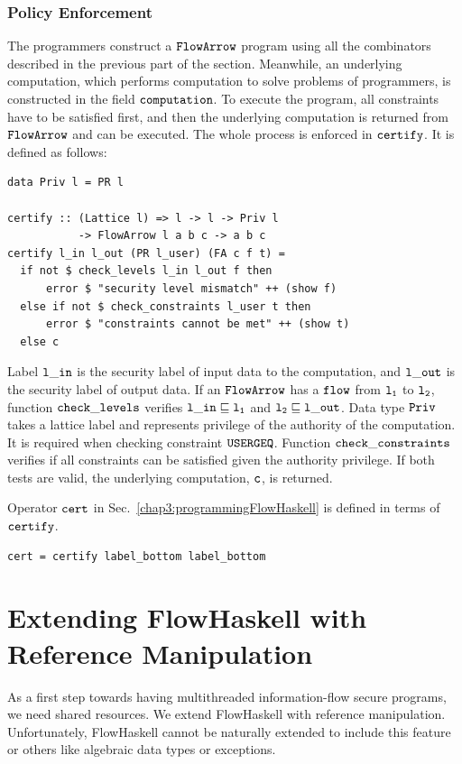 \documentclass[a4paper]{report}
\newcommand{\co}[1]{$\cod{#1}$}
\begin{document}
\subsection{Policy Enforcement}
The programmers construct a \co{FlowArrow} program using all the combinators 
described in the previous part of the section. Meanwhile, an underlying computation, which performs computation
to solve problems of programmers, is constructed in the field \co{computation}.  
To execute the program,
all constraints have to be satisfied first, and then the underlying computation
is returned from \co{FlowArrow} and can be executed.
The whole process is enforced in \co{certify}. It is defined as follows:
\begin{Verbatim}[fontsize=\footnotesize]
data Priv l = PR l

certify :: (Lattice l) => l -> l -> Priv l 
           -> FlowArrow l a b c -> a b c
certify l_in l_out (PR l_user) (FA c f t) =
  if not $ check_levels l_in l_out f then
      error $ "security level mismatch" ++ (show f)
  else if not $ check_constraints l_user t then
      error $ "constraints cannot be met" ++ (show t)
  else c
\end{Verbatim}
Label \co{l\_in} is the security label of input data to the computation,
and \co{l\_out} is the security label of output data. 
If an \co{FlowArrow} has a \co{flow} from \co{l_1} to \co{l_2}, function \co{check\_levels} 
verifies $\mathtt{l\_in} \sqsubseteq \mathtt{l_1}$ and $\mathtt{l_2} \sqsubseteq \mathtt{l\_out}$.
Data type \co{Priv} takes a lattice label and represents privilege of the authority of the
computation. It is required when checking constraint \co{USERGEQ}.
Function \co{check\_constraints} verifies if all constraints can be satisfied given the authority
privilege. If both tests are valid, the underlying computation, \co{c}, is returned.

Operator \co{cert} in Sec.~\ref{chap3:programmingFlowHaskell} is defined in terms of \co{certify}.
\begin{Verbatim}[fontsize=\footnotesize]
cert = certify label_bottom label_bottom
\end{Verbatim}



\chapter{Extending FlowHaskell with Reference Manipulation}

As a first step towards having multithreaded information-flow secure
programs, we need shared resources. We extend FlowHaskell with
reference manipulation. Unfortunately, FlowHaskell cannot be 
naturally extended to include this feature or others like algebraic
data types or exceptions.
\end{document}
